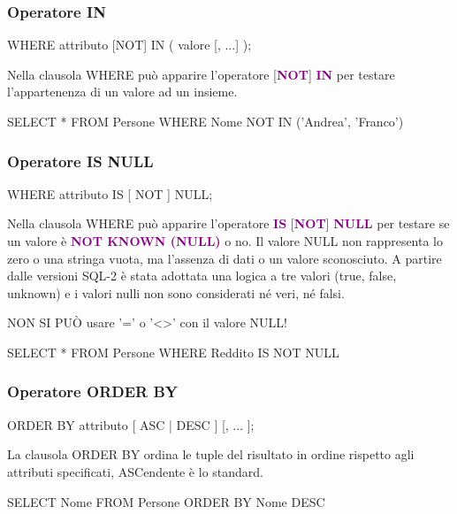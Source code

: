 \subsubsection{Operatore IN}
\begin{codiceSQL}
  WHERE attributo [NOT] IN ( valore [, ...] );

\end{codiceSQL}
Nella clausola WHERE può apparire l’operatore [\textbf{\textcolor{purple}{NOT}}] \textbf{\textcolor{purple}{IN}} per testare 
l’appartenenza di un valore ad un insieme.
\begin{codiceSQL}
SELECT *
FROM Persone
WHERE Nome NOT IN ('Andrea', 'Franco')
\end{codiceSQL}

\subsubsection{Operatore IS NULL}
\begin{codiceSQL}
WHERE attributo IS [ NOT ] NULL;
\end{codiceSQL}
Nella clausola WHERE può apparire l’operatore \textbf{\textcolor{purple}{IS}} [\textbf{\textcolor{purple}{NOT}}] \textbf{\textcolor{purple}{NULL}} per testare se un 
valore è \textbf{\textcolor{purple}{NOT KNOWN (NULL)}} o no.
Il valore NULL non rappresenta lo zero o una stringa vuota, ma l'assenza di dati 
o un valore sconosciuto.
A partire dalle versioni SQL-2 è stata adottata una logica a tre valori (true, 
false, unknown) e i valori nulli non sono considerati né veri, né falsi.\par
\begin{center}
NON SI PUÒ usare ’=’ o ’<>’ con il valore NULL!  
\end{center}

\begin{codiceSQL}
SELECT *
FROM Persone
WHERE Reddito IS NOT NULL
\end{codiceSQL}

\subsubsection{Operatore ORDER BY}
\begin{codiceSQL}
  ORDER BY attributo [{ ASC | DESC }] [, ... ];
\end{codiceSQL}
La clausola ORDER BY ordina le tuple del risultato in ordine rispetto agli attributi 
specificati,
ASCendente è lo standard.
\begin{codiceSQL}
SELECT Nome
FROM Persone
ORDER BY Nome DESC

\end{codiceSQL}

